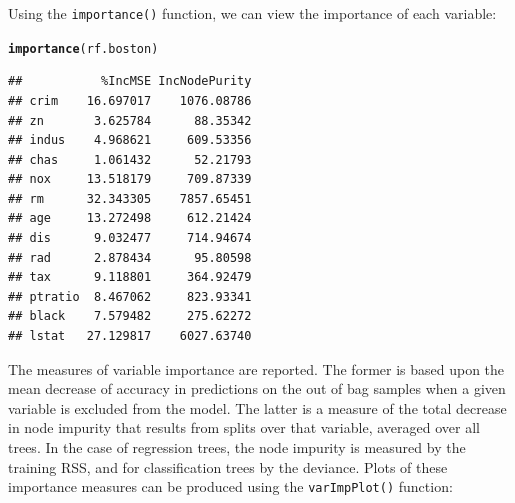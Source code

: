 \documentclass[12pt]{article}\usepackage[]{graphicx}\usepackage[]{color}
\makeatletter
\newcommand{\hlstd}[1]{\textcolor[rgb]{0.345,0.345,0.345}{#1}}%
\newcommand{\hlkwd}[1]{\textcolor[rgb]{0.737,0.353,0.396}{\textbf{#1}}}%
\newenvironment{kframe}{%
 \def\at@end@of@kframe{}%
 \ifinner\ifhmode%
  \def\at@end@of@kframe{\end{minipage}}%
  \begin{minipage}{\columnwidth}%
 \fi\fi%
 \def\FrameCommand##1{\hskip\@totalleftmargin \hskip-\fboxsep
 \colorbox{shadecolor}{##1}\hskip-\fboxsep
     \hskip-\linewidth \hskip-\@totalleftmargin \hskip\columnwidth}%
 \MakeFramed {\advance\hsize-\width
   \@totalleftmargin\z@ \linewidth\hsize
   \@setminipage}}%
 {\par\unskip\endMakeFramed%
 \at@end@of@kframe}
\newenvironment{knitrout}{}{} %
\makeatother
\begin{document}
Using the \texttt{importance()} function, we can view the importance of each variable:

\begin{knitrout}
\color{fgcolor}\begin{kframe}
\begin{alltt}
\hlkwd{importance}\hlstd{(rf.boston)}
\end{alltt}
\begin{verbatim}
##           %IncMSE IncNodePurity
## crim    16.697017    1076.08786
## zn       3.625784      88.35342
## indus    4.968621     609.53356
## chas     1.061432      52.21793
## nox     13.518179     709.87339
## rm      32.343305    7857.65451
## age     13.272498     612.21424
## dis      9.032477     714.94674
## rad      2.878434      95.80598
## tax      9.118801     364.92479
## ptratio  8.467062     823.93341
## black    7.579482     275.62272
## lstat   27.129817    6027.63740
\end{verbatim}
\end{kframe}
\end{knitrout}

The measures of variable importance are reported. The former is based upon the mean decrease of accuracy in predictions on the out of bag samples when a given variable is excluded from the model. The latter is a measure of the total decrease in node impurity that results from splits over that variable, averaged over all trees. In the case of regression trees, the node impurity is measured by the training RSS, and for classification trees by the deviance. Plots of these importance measures can be produced using the \texttt{varImpPlot()} function:
\end{document}

